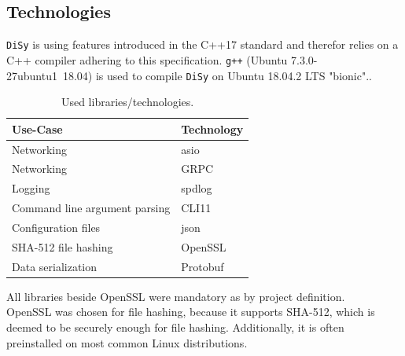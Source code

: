 \documentclass[a4paper]{article}
\begin{document}
\subsection{Technologies}
\texttt{DiSy} is using features introduced in the C++17 standard and therefor relies on a C++ compiler adhering to this specification. \texttt{g++} (Ubuntu 7.3.0-27ubuntu1~18.04) is used to compile \texttt{DiSy} on Ubuntu 18.04.2 LTS "bionic"..

\begin{table}[h]
\centering
\begin{tabular}{l|l}
Use-Case                      & Technology \\ \hline
Networking                    & asio       \\
Networking                    & GRPC       \\
Logging                       & spdlog     \\
Command line argument parsing & CLI11      \\
Configuration files           & json       \\
SHA-512 file hashing          & OpenSSL    \\
Data serialization            & Protobuf
\end{tabular}
\caption{Used libraries/technologies.}
\end{table}

All libraries beside OpenSSL were mandatory as by project definition. \\
OpenSSL was chosen for file hashing, because it supports SHA-512, which is deemed to be securely enough for file hashing. Additionally, it is often preinstalled on most common Linux distributions.
\end{document}
